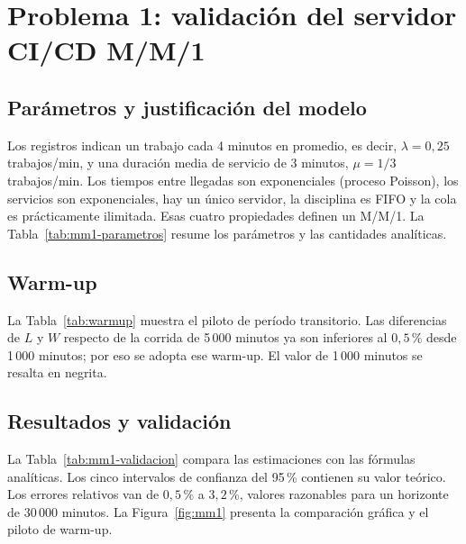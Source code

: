 \section{Problema 1: validación del servidor CI/CD M/M/1}

\subsection{Parámetros y justificación del modelo}

Los registros indican un trabajo cada 4 minutos en promedio, es decir,
$\lambda=0{,}25$ trabajos/min, y una duración media de servicio de 3 minutos,
$\mu=1/3$ trabajos/min. Los tiempos entre llegadas son exponenciales
(proceso Poisson), los servicios son exponenciales, hay un único servidor, la
disciplina es FIFO y la cola es prácticamente ilimitada. Esas cuatro
propiedades definen un M/M/1. La Tabla~\ref{tab:mm1-parametros} resume los
parámetros y las cantidades analíticas.

\begin{table}[H]
\centering
\small

\caption{Parámetros y valores analíticos del servidor CI/CD M/M/1.}
\label{tab:mm1-parametros}
\end{table}

\subsection{Warm-up}

La Tabla~\ref{tab:warmup} muestra el piloto de período transitorio. Las
diferencias de $L$ y $W$ respecto de la corrida de 5\,000 minutos ya son
inferiores al $0{,}5$\,\% desde 1\,000 minutos; por eso se adopta ese warm-up.
El valor de 1\,000 minutos se resalta en negrita.

\begin{table}[H]
\centering
\small

\caption{Piloto de warm-up del M/M/1 con 10 réplicas por candidato.}
\label{tab:warmup}
\end{table}

\subsection{Resultados y validación}

La Tabla~\ref{tab:mm1-validacion} compara las estimaciones con las fórmulas
analíticas. Los cinco intervalos de confianza del 95\,\% contienen su valor
teórico. Los errores relativos van de $0{,}5$\,\% a $3{,}2$\,\%, valores
razonables para un horizonte de 30\,000 minutos. La Figura~\ref{fig:mm1}
presenta la comparación gráfica y el piloto de warm-up.


